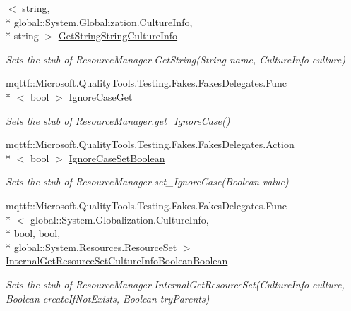 \begin{DoxyCompactItemize}
$<$ string, \\*
global\-::\-System.\-Globalization.\-Culture\-Info, \\*
string $>$ \hyperlink{class_system_1_1_component_model_1_1_fakes_1_1_stub_component_resource_manager_afbc367f76816439c3ac22f28257ad841}{Get\-String\-String\-Culture\-Info}
\begin{DoxyCompactList}\small\item\em Sets the stub of Resource\-Manager.\-Get\-String(\-String name, Culture\-Info culture)\end{DoxyCompactList}\item 
mqttf\-::\-Microsoft.\-Quality\-Tools.\-Testing.\-Fakes.\-Fakes\-Delegates.\-Func\\*
$<$ bool $>$ \hyperlink{class_system_1_1_component_model_1_1_fakes_1_1_stub_component_resource_manager_a9f71449ba5921fc079fe94194b83a237}{Ignore\-Case\-Get}
\begin{DoxyCompactList}\small\item\em Sets the stub of Resource\-Manager.\-get\-\_\-\-Ignore\-Case()\end{DoxyCompactList}\item 
mqttf\-::\-Microsoft.\-Quality\-Tools.\-Testing.\-Fakes.\-Fakes\-Delegates.\-Action\\*
$<$ bool $>$ \hyperlink{class_system_1_1_component_model_1_1_fakes_1_1_stub_component_resource_manager_a966ad31333709f1430f9955960fd6aba}{Ignore\-Case\-Set\-Boolean}
\begin{DoxyCompactList}\small\item\em Sets the stub of Resource\-Manager.\-set\-\_\-\-Ignore\-Case(\-Boolean value)\end{DoxyCompactList}\item 
mqttf\-::\-Microsoft.\-Quality\-Tools.\-Testing.\-Fakes.\-Fakes\-Delegates.\-Func\\*
$<$ global\-::\-System.\-Globalization.\-Culture\-Info, \\*
bool, bool, \\*
global\-::\-System.\-Resources.\-Resource\-Set $>$ \hyperlink{class_system_1_1_component_model_1_1_fakes_1_1_stub_component_resource_manager_ae534b1ca7a6d959bf776ac0206db4435}{Internal\-Get\-Resource\-Set\-Culture\-Info\-Boolean\-Boolean}
\begin{DoxyCompactList}\small\item\em Sets the stub of Resource\-Manager.\-Internal\-Get\-Resource\-Set(\-Culture\-Info culture, Boolean create\-If\-Not\-Exists, Boolean try\-Parents)\end{DoxyCompactList}\item 

\end{DoxyCompactItemize}
